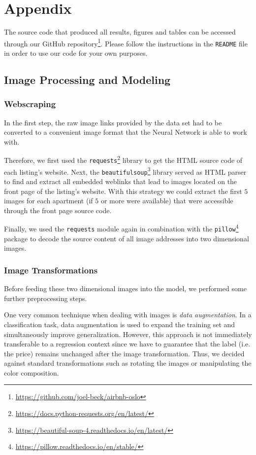 \newpage
\appendix
\section{Appendix}

The source code that produced all results, figures and tables can be accessed through our GitHub repository\footnote{\url{https://github.com/joel-beck/airbnb-oslo}}.
Please follow the instructions in the \texttt{README} file in order to use our code for your own purposes.

\subsection{Image Processing and Modeling} \label{appendix:images}

\subsubsection{Webscraping}

In the first step, the raw image links provided by the data set had to be converted to a convenient image format that the Neural Network is able to work with.

Therefore, we first used the \texttt{requests}\footnote{\url{https://docs.python-requests.org/en/latest/}} library to get the HTML source code of each listing's website.
Next, the \texttt{beautifulsoup}\footnote{\url{https://beautiful-soup-4.readthedocs.io/en/latest/}} library served as HTML parser to find and extract all embedded weblinks that lead to images located on the front page of the listing's website.
With this strategy we could extract the first $5$ images for each apartment (if $5$ or more were available) that were accessible through the front page source code.

Finally, we used the \texttt{requests} module again in combination with the \texttt{pillow}\footnote{\url{https://pillow.readthedocs.io/en/stable/}} package to decode the source content of all image addresses into two dimensional images.

\subsubsection{Image Transformations}

Before feeding these two dimensional images into the model, we performed some further preprocessing steps.

One very common technique when dealing with images is \emph{data augmentation}.
In a classification task, data augmentation is used to expand the training set and simultaneously improve generalization. However, this approach is not immediately transferable to a regression context since we have to guarantee that the label (i.e. the price) remains unchanged after the image transformation.
Thus, we decided against standard transformations such as rotating the images or manipulating the color composition.

